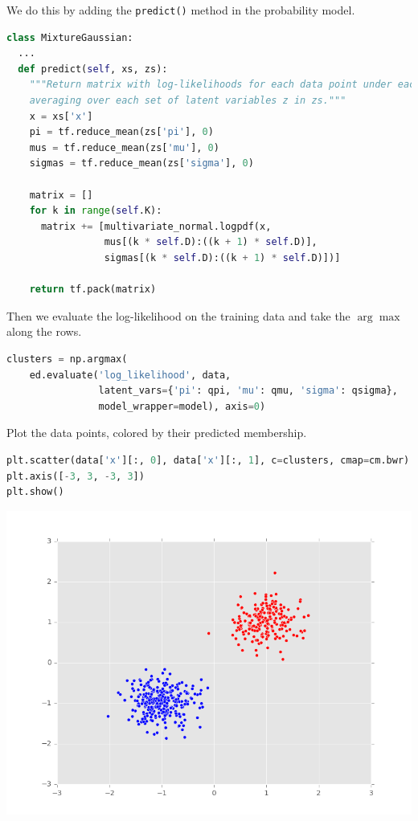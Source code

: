 We do this by adding the \texttt{predict()} method in the
probability model.
\begin{lstlisting}[language=Python]
class MixtureGaussian:
  ...
  def predict(self, xs, zs):
    """Return matrix with log-likelihoods for each data point under each cluster,
    averaging over each set of latent variables z in zs."""
    x = xs['x']
    pi = tf.reduce_mean(zs['pi'], 0)
    mus = tf.reduce_mean(zs['mu'], 0)
    sigmas = tf.reduce_mean(zs['sigma'], 0)

    matrix = []
    for k in range(self.K):
      matrix += [multivariate_normal.logpdf(x,
                 mus[(k * self.D):((k + 1) * self.D)],
                 sigmas[(k * self.D):((k + 1) * self.D)])]

    return tf.pack(matrix)
\end{lstlisting}
Then we evaluate the log-likelihood on the training data
and take the $\arg\max$ along the rows.
\begin{lstlisting}[language=Python]
clusters = np.argmax(
    ed.evaluate('log_likelihood', data,
                latent_vars={'pi': qpi, 'mu': qmu, 'sigma': qsigma},
                model_wrapper=model), axis=0)
\end{lstlisting}

Plot the data points, colored by their predicted membership.
\begin{lstlisting}[language=Python]
plt.scatter(data['x'][:, 0], data['x'][:, 1], c=clusters, cmap=cm.bwr)
plt.axis([-3, 3, -3, 3])
plt.show()
\end{lstlisting}

\includegraphics[width=700px]{images/unsupervised-fig1.png}
